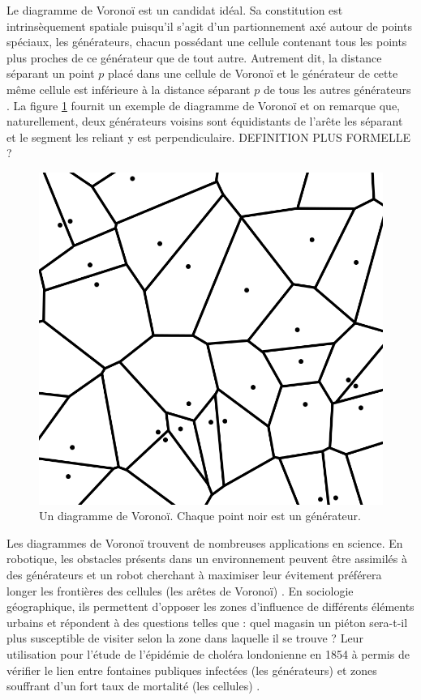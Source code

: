 \documentclass[12pt]{article}
\begin{document}
Le diagramme de Voronoï est un candidat idéal. Sa constitution est
intrinsèquement spatiale puisqu'il s'agit d'un partionnement axé
autour de points spéciaux, les générateurs, chacun possédant une
cellule contenant tous les points plus proches de ce générateur que de
tout autre. Autrement dit, la distance séparant un point $p$ placé
dans une cellule de Voronoï et le générateur de cette même cellule est
inférieure à la distance séparant $p$ de tous les autres générateurs
\cite{Edwards1993}. La figure \ref{fig:voronoi} fournit un exemple de
diagramme de Voronoï et on remarque que, naturellement, deux
générateurs voisins sont équidistants de l'arête les séparant et le
segment les reliant y est perpendiculaire. DEFINITION PLUS FORMELLE ?

\begin{figure}[!ht]
  \centering
  \includegraphics[width=0.7\linewidth]{images/voronoi.png}
  \caption{Un diagramme de Voronoï. Chaque point noir est un générateur.}
  \label{fig:voronoi}
\end{figure}

Les diagrammes de Voronoï trouvent de nombreuses applications en
science. En robotique, les obstacles présents dans un environnement
peuvent être assimilés à des générateurs et un robot cherchant à
maximiser leur évitement préférera longer les frontières des cellules
(les arêtes de Voronoï) \cite{Garrido2006}. En sociologie
géographique, ils permettent d'opposer les zones d'influence de
différents éléments urbains et répondent à des questions telles que :
quel magasin un piéton sera-t-il plus susceptible de visiter selon la
zone dans laquelle il se trouve ? Leur utilisation pour l'étude de
l'épidémie de choléra londonienne en 1854 à permis de vérifier le lien
entre fontaines publiques infectées (les générateurs) et zones
souffrant d'un fort taux de mortalité (les cellules)
\cite{Thomas2010}.
\end{document}
